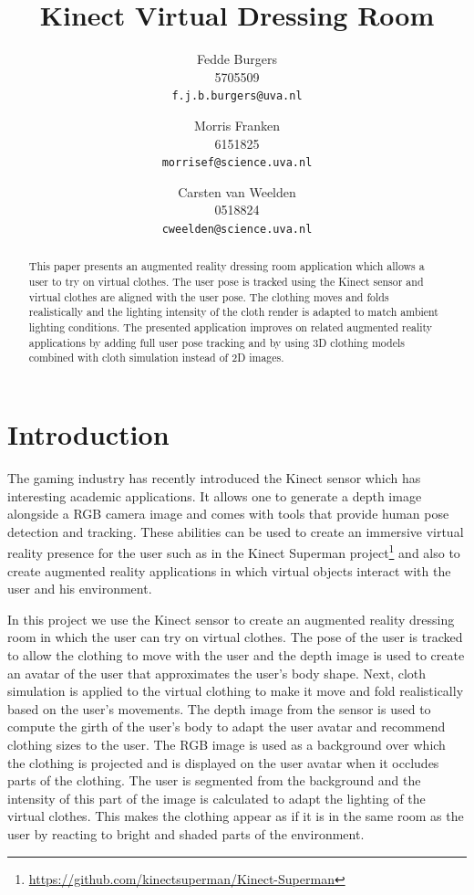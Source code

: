 \documentclass[twocolumn,a4paper]{article}
\title{Kinect Virtual Dressing Room}
\author{Fedde Burgers \\ 5705509 \\ \texttt{f.j.b.burgers@uva.nl} \and Morris Franken \\ 6151825 \\ \texttt{morrisef@science.uva.nl} \and Carsten van Weelden \\ 0518824 \\ \texttt{cweelden@science.uva.nl}}
\begin{document}
\maketitle

\begin{abstract}
This paper presents an augmented reality dressing room application which allows a user to try on virtual clothes. The user pose is tracked using the Kinect sensor and virtual clothes are aligned with the user pose. The clothing moves and folds realistically and the lighting intensity of the cloth render is adapted to match ambient lighting conditions. The presented application improves on related augmented reality applications by adding full user pose tracking and by using 3D clothing models combined with cloth simulation instead of 2D images. 
\end{abstract}

\par{}

\section{Introduction}
\label{sec:introduction}

The gaming industry has recently introduced the Kinect sensor which has interesting academic applications. It allows one to generate a depth image alongside a RGB camera image and comes with tools that provide human pose detection and tracking. These abilities can be used to create an immersive virtual reality presence for the user such as in the Kinect Superman project\footnote{\url{https://github.com/kinectsuperman/Kinect-Superman}} and also to create augmented reality applications in which virtual objects interact with the user and his environment.

In this project we use the Kinect sensor to create an augmented reality dressing room in which the user can try on virtual clothes. The pose of the user is tracked to allow the clothing to move with the user and the depth image is used to create an avatar of the user that approximates the user's body shape. Next, cloth simulation is applied to the virtual clothing to make it move and fold realistically based on the user's movements. The depth image from the sensor is used to compute the girth of the user's body to adapt the user avatar and recommend clothing sizes to the user. The RGB image is used as a background over which the clothing is projected and is displayed on the user avatar when it occludes parts of the clothing. The user is segmented from the background and the intensity of this part of the image is calculated to adapt the lighting of the virtual clothes. This makes the clothing appear as if it is in the same room as the user by reacting to bright and shaded parts of the environment.
\end{document}
